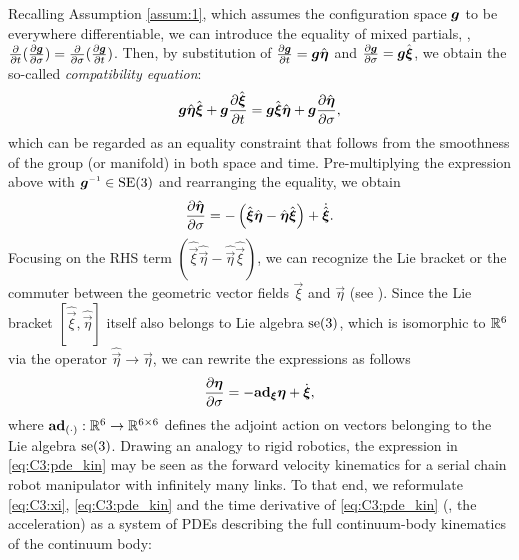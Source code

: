 Recalling Assumption \ref{assum:1}, which assumes the configuration space $\boldsymbol{g}$ to be everywhere differentiable, we can introduce the equality of mixed partials, \ie, $\frac{\partial }{\partial t}(\frac{\partial \boldsymbol{g}}{\partial \sigma}) = \frac{\partial }{\partial \sigma} (\frac{\partial \boldsymbol{g}}{\partial t})$. Then, by substitution of $\frac{\partial \boldsymbol{g}}{\partial t} = \boldsymbol{g}\hat{\boldsymbol{\eta}}$ and $\frac{\partial \boldsymbol{g}}{\partial \sigma} = \boldsymbol{g}\hat{\boldsymbol{\xi}}$, we obtain the so-called \emph{compatibility equation}:
%
\begin{equation}
\boldsymbol{g} \hat{\boldsymbol{\eta}}\hat{\boldsymbol{\xi}} + \boldsymbol{g} \frac{\partial \hat{\boldsymbol{\xi}}}{\partial t}  = \boldsymbol{g} \hat{\boldsymbol{\xi}} \hat{\boldsymbol{\eta}}  + \boldsymbol{g} \frac{\partial \hat{\boldsymbol{\eta}}}{\partial \sigma},
\label{eq:C3:compatibility}
\end{equation}
%
\noindent which can be regarded as an equality constraint that follows from the smoothness of the group (or manifold) in both space and time. Pre-multiplying the expression above with $\mat{g} \inv \in \SE{3}$ and rearranging the equality, we obtain
%
\begin{equation}
\frac{\partial \hat{\boldsymbol{\eta}}}{\partial \sigma} = -\left(\hat{\boldsymbol{\xi}}\hat{\boldsymbol{\eta}} - \hat{\boldsymbol{\eta}}\hat{\boldsymbol{\xi}} \right) + \dot{\hat{\boldsymbol{\xi}}}.
\end{equation}
%
\noindent Focusing on the RHS term $(\hat{\vec{\xi}}\hat{\vec{\eta}} - \hat{\vec{\eta}}\hat{\vec{\xi}})$, we can recognize the Lie bracket or the commuter between the geometric vector fields $\vec{\xi}$ and $\vec{\eta}$ (see \cite{Murray1994}). Since the Lie bracket $[\hat{\vec{\xi}},\hat{\vec{\eta}}]$ itself also belongs to Lie algebra $\textup{\textrm{se}}(3)$, which is isomorphic to $\mathbb{R}^6$ via the operator $\hat{\vec{\eta}} \to \vec{\eta}$, we can rewrite the expressions as follows
%
\begin{equation}
\frac{\partial \boldsymbol{\eta}}{\partial \sigma} = -\textbf{ad}_{\boldsymbol{\xi}}\boldsymbol{\eta} + \dot{\boldsymbol{\xi}},
\label{eq:C3:pde_kin}
\end{equation}
%
\noindent where $\textbf{ad}_{(\cdot)}: \mathbb{R}^6 \to \mathbb{R}^{6\times 6}$ defines the adjoint action on vectors belonging to the Lie algebra $\textup{\textrm{se}}(3)$. %
Drawing an analogy to rigid robotics, the expression in \eqref{eq:C3:pde_kin} may be seen as the forward velocity kinematics for a serial chain robot manipulator with infinitely many links. To that end, we reformulate \eqref{eq:C3:xi}, \eqref{eq:C3:pde_kin} and the time derivative of \eqref{eq:C3:pde_kin} (\ie, the acceleration) as a system of PDEs describing the full continuum-body kinematics of the continuum body:
